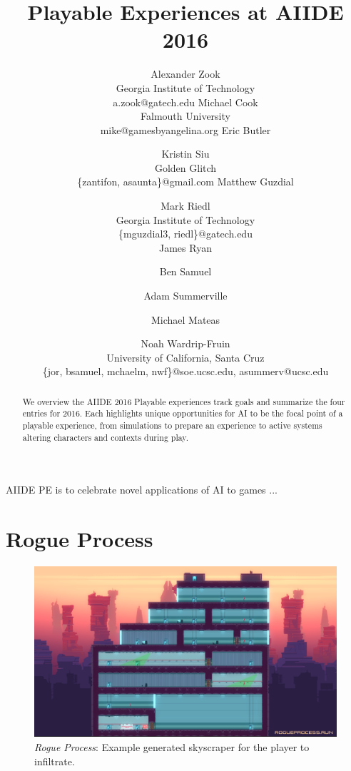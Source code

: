 \documentclass[letterpaper]{article}
\begin{document}
\title{Playable Experiences at AIIDE 2016}
\author{
Alexander Zook \\ Georgia Institute of Technology \\ a.zook@gatech.edu
\And Michael Cook \\ Falmouth University \\ mike@gamesbyangelina.org
\AND Eric Butler \and Kristin Siu \\ Golden Glitch \\ \{zantifon, asaunta\}@gmail.com
\And Matthew Guzdial \and Mark Riedl \\ Georgia Institute of Technology \\ \{mguzdial3, riedl\}@gatech.edu \\
\AND James Ryan \and Ben Samuel \and Adam Summerville \and Michael Mateas \and Noah Wardrip-Fruin \\ University of California, Santa Cruz \\ \{jor, bsamuel, mchaelm, nwf\}@soe.ucsc.edu, asummerv@ucsc.edu \\
}


\maketitle
\begin{abstract}
We overview the AIIDE 2016 Playable experiences track goals and summarize the four entries for 2016.
Each highlights unique opportunities for AI to be the focal point of a playable experience, from simulations to prepare an experience to active systems altering characters and contexts during play.
\end{abstract}

\noindent AIIDE PE is to celebrate novel applications of AI to games
...

\section{Rogue Process}

\begin{figure}[tbh]
  \centering
  \includegraphics[width=\columnwidth]{images/rogue_process-screen}
  \caption{\textit{Rogue Process}: Example generated skyscraper for the player to infiltrate.}
  \label{fig:rp-setting}
\end{figure}
\end{document}
